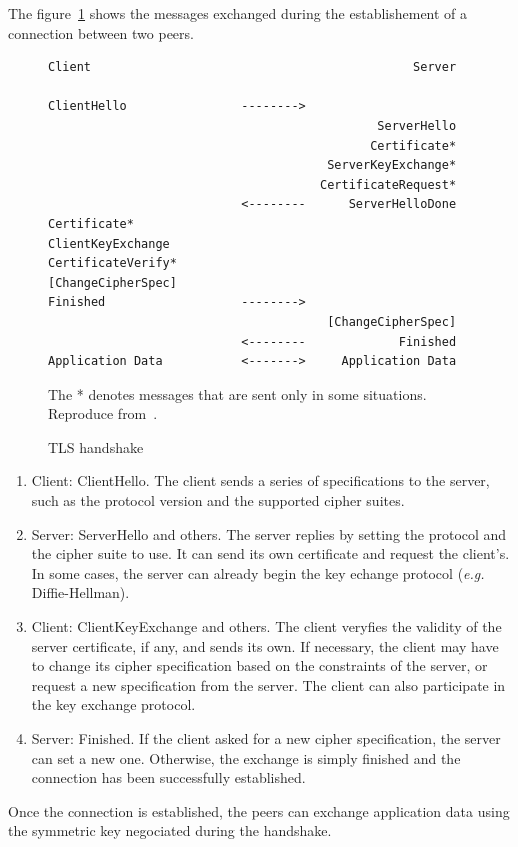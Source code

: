 \noindent The figure~\ref{fig:tls-handshake} shows the messages exchanged during the establishement of a connection between two peers.


\begin{figure}[ht]
\begin{verbatim}
Client                                             Server

ClientHello                -------->
                                              ServerHello
                                             Certificate*
                                       ServerKeyExchange*
                                      CertificateRequest*
                           <--------      ServerHelloDone
Certificate*
ClientKeyExchange
CertificateVerify*
[ChangeCipherSpec]
Finished                   -------->
                                       [ChangeCipherSpec]
                           <--------             Finished
Application Data           <------->     Application Data
\end{verbatim}
\caption{TLS handshake}{The * denotes messages that are sent only in some situations. Reproduce from~\cite{rfc5246}.}
\label{fig:tls-handshake}
\end{figure}

\begin{enumerate}
	\item Client: ClientHello. The client sends a series of specifications to the server, such as the protocol version and the supported cipher suites.
	\item Server: ServerHello and others. The server replies by setting the protocol and the cipher suite to use.
	It can send its own certificate and request the client's.
	In some cases, the server can already begin the key echange protocol (\textit{e.g.} Diffie-Hellman).
	\item Client: ClientKeyExchange and others. The client veryfies the validity of the server certificate, if any, and sends its own. If necessary, the client may have to change its cipher specification based on the constraints of the server, or request a new specification from the server.
	The client can also participate in the key exchange protocol.
	\item Server: Finished. If the client asked for a new cipher specification, the server can set a new one. Otherwise, the exchange is simply finished and the connection has been successfully established.
\end{enumerate}

Once the connection is established, the peers can exchange application data using the symmetric key negociated during the handshake.








